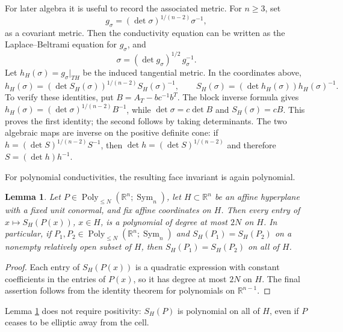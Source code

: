 \documentclass[11pt,oneside]{article}
\newtheorem{lemma}[theorem]{Lemma}
\newcommand{\R}{\mathbb R}
\newcommand{\Sym}{\operatorname{Sym}}
\begin{document}
For later algebra it is useful to record the associated metric.  For
\(n\ge3\), set
\begin{equation}
  g_\sigma=(\det \sigma)^{1/(n-2)}\sigma^{-1},
  \label{eq:metric-from-conductivity}
\end{equation}
as a covariant metric.  Then the conductivity equation can be written as the
Laplace--Beltrami equation for \(g_\sigma\), and
\begin{equation}
  \sigma=(\det g_\sigma)^{1/2}\,g_\sigma^{-1}.
  \label{eq:conductivity-from-metric}
\end{equation}
Let \(h_H(\sigma)=g_\sigma|_{TH}\) be the induced tangential metric.  In the
coordinates above,
\begin{equation}
  h_H(\sigma)=(\det S_H(\sigma))^{1/(n-2)}S_H(\sigma)^{-1},
  \qquad
  S_H(\sigma)=(\det h_H(\sigma))h_H(\sigma)^{-1}.
  \label{eq:metric-schur-relation}
\end{equation}
To verify these identities, put \(B=A_T-bc^{-1}b^T\).  The block inverse
formula gives \(h_H(\sigma)=(\det\sigma)^{1/(n-2)}B^{-1}\), while
\(\det\sigma=c\det B\) and \(S_H(\sigma)=cB\).  This proves the first identity;
  the second follows by taking determinants.  The two algebraic maps are inverse on the
positive definite cone: if
\(h=(\det S)^{1/(n-2)}S^{-1}\), then
\(\det h=(\det S)^{1/(n-2)}\) and therefore \(S=(\det h)h^{-1}\).

For polynomial conductivities, the resulting face invariant is again
polynomial.

\begin{lemma}
\label{lem:schur-polynomial}
Let \(P\in\operatorname{Poly}_{\le N}(\R^n;\Sym_n)\), let \(H\subset\R^n\) be
an affine hyperplane with a fixed unit conormal, and fix affine coordinates on
\(H\).  Then every entry of \(x\mapsto S_H(P(x))\), \(x\in H\), is a
polynomial of degree at most \(2N\) on \(H\).  In particular, if
\(P_1,P_2\in\operatorname{Poly}_{\le N}(\R^n;\Sym_n)\) and
\(S_H(P_1)=S_H(P_2)\) on a nonempty relatively open subset of \(H\), then
\(S_H(P_1)=S_H(P_2)\) on all of \(H\).
\end{lemma}

\begin{proof}
Each entry of \(S_H(P(x))\) is a quadratic expression with constant
coefficients in the entries of \(P(x)\), so it has degree at most \(2N\) on
\(H\).  The final assertion follows from the identity theorem for polynomials
on \(\R^{n-1}\).
\end{proof}

Lemma \ref{lem:schur-polynomial} does not require positivity: \(S_H(P)\) is
polynomial on all of \(H\), even if \(P\) ceases to be elliptic away from the
cell.
\end{document}
